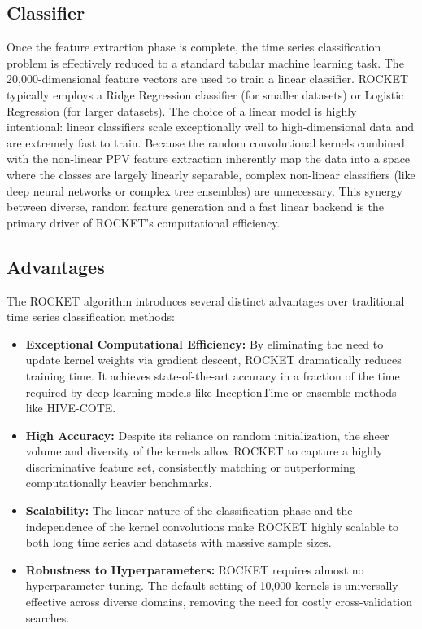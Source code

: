 \documentclass[conference]{IEEEtran}
\begin{document}
\subsection{Classifier}
Once the feature extraction phase is complete, the time series classification problem is effectively reduced to a standard tabular machine learning task. The 20,000-dimensional feature vectors are used to train a linear classifier. ROCKET typically employs a Ridge Regression classifier (for smaller datasets) or Logistic Regression (for larger datasets). The choice of a linear model is highly intentional: linear classifiers scale exceptionally well to high-dimensional data and are extremely fast to train. Because the random convolutional kernels combined with the non-linear PPV feature extraction inherently map the data into a space where the classes are largely linearly separable, complex non-linear classifiers (like deep neural networks or complex tree ensembles) are unnecessary. This synergy between diverse, random feature generation and a fast linear backend is the primary driver of ROCKET's computational efficiency.

\subsection{Advantages}
The ROCKET algorithm introduces several distinct advantages over traditional time series classification methods:
\begin{itemize}
    \item \textbf{Exceptional Computational Efficiency:} By eliminating the need to update kernel weights via gradient descent, ROCKET dramatically reduces training time. It achieves state-of-the-art accuracy in a fraction of the time required by deep learning models like InceptionTime or ensemble methods like HIVE-COTE.
    \item \textbf{High Accuracy:} Despite its reliance on random initialization, the sheer volume and diversity of the kernels allow ROCKET to capture a highly discriminative feature set, consistently matching or outperforming computationally heavier benchmarks.
    \item \textbf{Scalability:} The linear nature of the classification phase and the independence of the kernel convolutions make ROCKET highly scalable to both long time series and datasets with massive sample sizes.
    \item \textbf{Robustness to Hyperparameters:} ROCKET requires almost no hyperparameter tuning. The default setting of 10,000 kernels is universally effective across diverse domains, removing the need for costly cross-validation searches.
\end{itemize}
\end{document}
